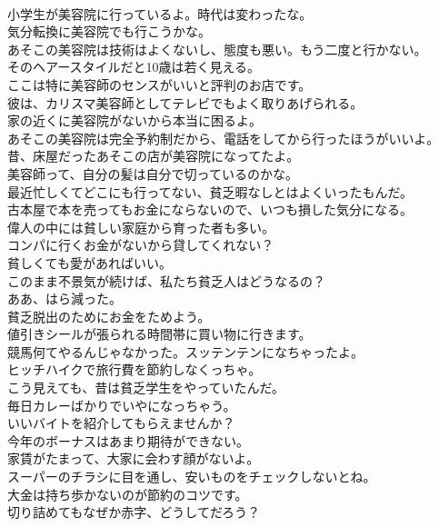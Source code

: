 \documentclass[8pt]{extreport}
\begin{document}
\begin{CJK}{UTF8}{min}
\\	小学生が美容院に行っているよ。時代は変わったな。	
\\	気分転換に美容院でも行こうかな。	
\\	あそこの美容院は技術はよくないし、態度も悪い。もう二度と行かない。	
\\	そのヘアースタイルだと10歳は若く見える。	
\\	ここは特に美容師のセンスがいいと評判のお店です。	
\\	彼は、カリスマ美容師としてテレビでもよく取りあげられる。	
\\	家の近くに美容院がないから本当に困るよ。	
\\	あそこの美容院は完全予約制だから、電話をしてから行ったほうがいいよ。	
\\	昔、床屋だったあそこの店が美容院になってたよ。	
\\	美容師って、自分の髪は自分で切っているのかな。	
\\	最近忙しくてどこにも行ってない、貧乏暇なしとはよくいったもんだ。	
\\	古本屋で本を売ってもお金にならないので、いつも損した気分になる。	
\\	偉人の中には貧しい家庭から育った者も多い。	
\\	コンパに行くお金がないから貸してくれない？	
\\	貧しくても愛があればいい。	
\\	このまま不景気が続けば、私たち貧乏人はどうなるの？	
\\	ああ、はら減った。	
\\	貧乏脱出のためにお金をためよう。	
\\	値引きシールが張られる時間帯に買い物に行きます。	
\\	競馬何てやるんじゃなかった。スッテンテンになちゃったよ。	
\\	ヒッチハイクで旅行費を節約しなくっちゃ。	
\\	こう見えても、昔は貧乏学生をやっていたんだ。	
\\	毎日カレーばかりでいやになっちゃう。	
\\	いいバイトを紹介してもらえませんか？	
\\	今年のボーナスはあまり期待ができない。	
\\	家賃がたまって、大家に会わす顔がないよ。	
\\	スーパーのチラシに目を通し、安いものをチェックしないとね。	
\\	大金は持ち歩かないのが節約のコツです。	
\\	切り詰めてもなぜか赤字、どうしてだろう？	

\end{CJK}
\end{document}
